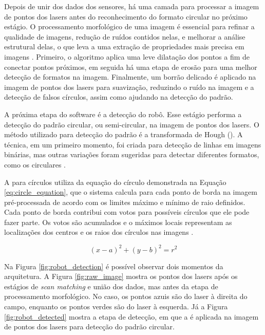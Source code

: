 \documentclass[acronym, symbols, table]{fei}
\begin{document}
				Depois de unir dos dados dos sensores, há uma camada para processar a imagem de pontos dos lasers antes do reconhecimento do formato circular no próximo estágio. O processamento morfológico de uma imagem é essencial para refinar a qualidade de imagens, redução de ruídos contidos nelas, e melhorar a análise estrutural delas, o que leva a uma extração de propriedades mais precisa em imagens \cite{lotufo2023morphological}. Primeiro, o algoritmo aplica uma leve dilatação dos pontos a fim de conectar pontos próximos, em seguida há uma etapa de erosão para uma melhor detecção de formatos na imagem. Finalmente, um borrão delicado é aplicado na imagem de pontos dos lasers para suavização, reduzindo o ruído na imagem e a detecção de falsos círculos, assim como ajudando na detecção do padrão.
			
				A próxima etapa do software é a detecção do robô. Esse estágio performa a detecção do padrão circular, ou semi-circular, na imagem de pontos dos lasers. O método utilizado para detecção do padrão é a transformada de Hough (). A técnica, em um primeiro momento, foi criada para detecção de linhas em imagens binárias, mas outras variações foram sugeridas para detectar diferentes formatos, como os circulares \cite{mukhopadhyay2015survey}.
				
				A  para círculos utiliza da equação do círculo demonstrada na Equação \eqref{eq:circle_equation}, que o sistema calcula para cada ponto de borda na imagem pré-processada de acordo com os limites máximo e mínimo de raio definidos. Cada ponto de borda contribui com votos para possíveis círculos que ele pode fazer parte. Os votos são acumulados e o máximos locais representam as localizações dos centros e os raios dos círculos nas imagens \cite{hassanein2015survey}.
				
				\begin{equation}
					\label{eq:circle_equation}
					(x-a)^2 + (y-b)^2 = r^2
				\end{equation}
			
				Na Figura \ref{fig:robot_detection} é possível observar dois momentos da arquitetura. A Figura \ref{fig:raw_image} mostra os pontos dos lasers após os estágios de \textit{scan matching} e união dos dados, mas antes da etapa de processamento morfológico. No caso, os pontos azuis são do laser à direita do campo, enquanto os pontos verdes são do laser à esquerda. Já a Figura \ref{fig:robot_detected} mostra a etapa de detecção, em que a  é aplicada na imagem de pontos dos lasers para detecção do padrão circular.
				
\end{document}
